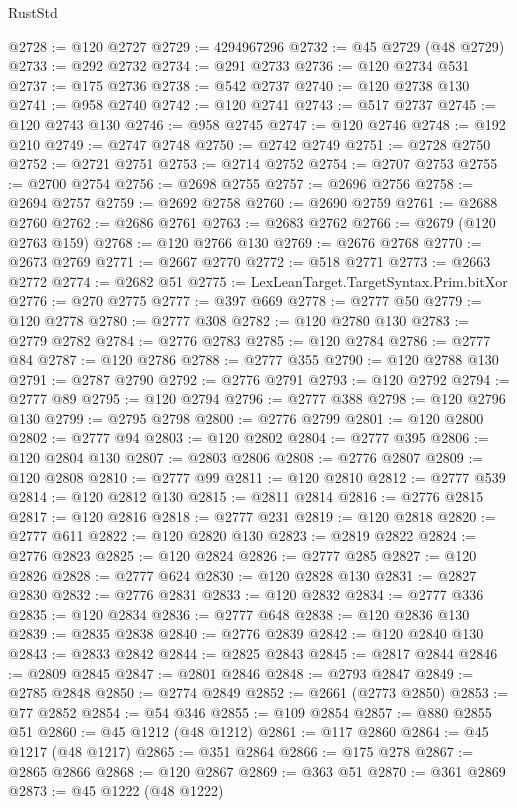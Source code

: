 \begin{lexlean}{RustStd}
\begin{coremodule}
{\begin{coremodule}
{{{{{{{{{{{{{{{{{{{{{{{{{{{{{{{{{{{{{{{{{{{{{{{{{{{{{{{{{{{{@2728 := @120 @2727
@2729 := 4294967296
@2732 := @45 @2729 (@48 @2729)
@2733 := @292 @2732
@2734 := @291 @2733
@2736 := @120 @2734 @531
@2737 := @175 @2736
@2738 := @542 @2737
@2740 := @120 @2738 @130
@2741 := @958 @2740
@2742 := @120 @2741
@2743 := @517 @2737
@2745 := @120 @2743 @130
@2746 := @958 @2745
@2747 := @120 @2746
@2748 := @192 @210
@2749 := @2747 @2748
@2750 := @2742 @2749
@2751 := @2728 @2750
@2752 := @2721 @2751
@2753 := @2714 @2752
@2754 := @2707 @2753
@2755 := @2700 @2754
@2756 := @2698 @2755
@2757 := @2696 @2756
@2758 := @2694 @2757
@2759 := @2692 @2758
@2760 := @2690 @2759
@2761 := @2688 @2760
@2762 := @2686 @2761
@2763 := @2683 @2762
@2766 := @2679 (@120 @2763 @159)
@2768 := @120 @2766 @130
@2769 := @2676 @2768
@2770 := @2673 @2769
@2771 := @2667 @2770
@2772 := @518 @2771
@2773 := @2663 @2772
@2774 := @2682 @51
@2775 := LexLeanTarget.TargetSyntax.Prim.bitXor
@2776 := @270 @2775
@2777 := @397 @669
@2778 := @2777 @50
@2779 := @120 @2778
@2780 := @2777 @308
@2782 := @120 @2780 @130
@2783 := @2779 @2782
@2784 := @2776 @2783
@2785 := @120 @2784
@2786 := @2777 @84
@2787 := @120 @2786
@2788 := @2777 @355
@2790 := @120 @2788 @130
@2791 := @2787 @2790
@2792 := @2776 @2791
@2793 := @120 @2792
@2794 := @2777 @89
@2795 := @120 @2794
@2796 := @2777 @388
@2798 := @120 @2796 @130
@2799 := @2795 @2798
@2800 := @2776 @2799
@2801 := @120 @2800
@2802 := @2777 @94
@2803 := @120 @2802
@2804 := @2777 @395
@2806 := @120 @2804 @130
@2807 := @2803 @2806
@2808 := @2776 @2807
@2809 := @120 @2808
@2810 := @2777 @99
@2811 := @120 @2810
@2812 := @2777 @539
@2814 := @120 @2812 @130
@2815 := @2811 @2814
@2816 := @2776 @2815
@2817 := @120 @2816
@2818 := @2777 @231
@2819 := @120 @2818
@2820 := @2777 @611
@2822 := @120 @2820 @130
@2823 := @2819 @2822
@2824 := @2776 @2823
@2825 := @120 @2824
@2826 := @2777 @285
@2827 := @120 @2826
@2828 := @2777 @624
@2830 := @120 @2828 @130
@2831 := @2827 @2830
@2832 := @2776 @2831
@2833 := @120 @2832
@2834 := @2777 @336
@2835 := @120 @2834
@2836 := @2777 @648
@2838 := @120 @2836 @130
@2839 := @2835 @2838
@2840 := @2776 @2839
@2842 := @120 @2840 @130
@2843 := @2833 @2842
@2844 := @2825 @2843
@2845 := @2817 @2844
@2846 := @2809 @2845
@2847 := @2801 @2846
@2848 := @2793 @2847
@2849 := @2785 @2848
@2850 := @2774 @2849
@2852 := @2661 (@2773 @2850)
@2853 := @77 @2852
@2854 := @54 @346
@2855 := @109 @2854
@2857 := @880 @2855 @51
@2860 := @45 @1212 (@48 @1212)
@2861 := @117 @2860
@2864 := @45 @1217 (@48 @1217)
@2865 := @351 @2864
@2866 := @175 @278
@2867 := @2865 @2866
@2868 := @120 @2867
@2869 := @363 @51
@2870 := @361 @2869
@2873 := @45 @1222 (@48 @1222)
}}}}}}}}}}}}}}}}}}}}}}}}}}}}}}}}}}}}}}}}}}}}}}}}}}}}}}}}}}}}
\end{coremodule}}
\end{coremodule}
\end{lexlean}
